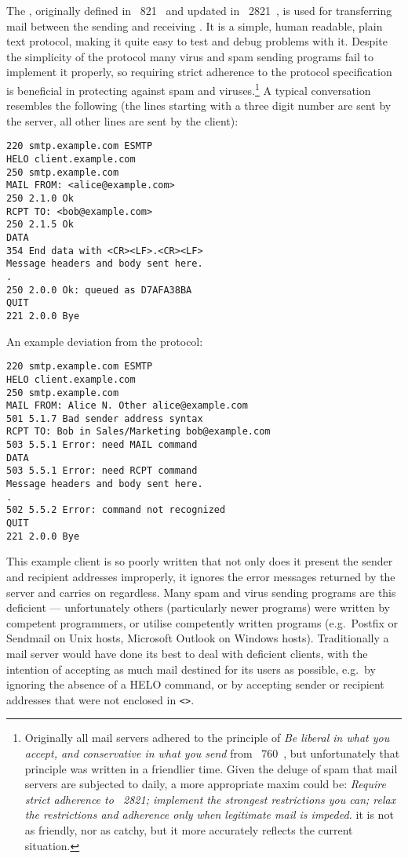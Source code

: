 The \SMTPlong{}, originally defined in \RFC{}~821~\cite{RFC821} and updated
in \RFC{}~2821~\cite{RFC2821}, is used for transferring mail between the
sending and receiving \MTA{}\@.  It is a simple, human readable, plain text
protocol, making it quite easy to test and debug problems with it.  Despite
the simplicity of the protocol many virus and spam sending programs fail
to implement it properly, so requiring strict adherence to the protocol
specification is beneficial in protecting against spam and
viruses.\footnote{\label{footnote:rfc760}Originally all mail servers
adhered to the principle of \textit{Be liberal in what you accept, and
conservative in what you send\/} from \RFC{}~760~\cite{rfc760}, but
unfortunately that principle was written in a friendlier time.  Given the
deluge of spam that mail servers are subjected to daily, a more appropriate
maxim could be: \textit{Require strict adherence to \RFC{}~2821; implement
the strongest restrictions you can; relax the restrictions and adherence
only when legitimate mail is impeded.\/}  it is not as friendly, nor as
catchy, but it more accurately reflects the current situation.} A typical
\SMTP{} conversation resembles the following (the lines starting with a
three digit number are sent by the server, all other lines are sent by the
client):

\begin{verbatim}
220 smtp.example.com ESMTP
HELO client.example.com
250 smtp.example.com
MAIL FROM: <alice@example.com>
250 2.1.0 Ok
RCPT TO: <bob@example.com>
250 2.1.5 Ok
DATA
354 End data with <CR><LF>.<CR><LF>
Message headers and body sent here.
.
250 2.0.0 Ok: queued as D7AFA38BA
QUIT
221 2.0.0 Bye
\end{verbatim}

An example deviation from the protocol:

\begin{verbatim}
220 smtp.example.com ESMTP
HELO client.example.com
250 smtp.example.com
MAIL FROM: Alice N. Other alice@example.com
501 5.1.7 Bad sender address syntax
RCPT TO: Bob in Sales/Marketing bob@example.com
503 5.5.1 Error: need MAIL command
DATA
503 5.5.1 Error: need RCPT command
Message headers and body sent here.
.
502 5.5.2 Error: command not recognized
QUIT
221 2.0.0 Bye
\end{verbatim}

This example client is so poorly written that not only does it present the
sender and recipient addresses improperly, it ignores the error messages
returned by the server and carries on regardless.  Many spam and virus
sending programs are this deficient --- unfortunately others (particularly
newer programs) were written by competent programmers, or utilise
competently written programs (e.g.\ Postfix or Sendmail on Unix hosts,
Microsoft Outlook on Windows hosts).  Traditionally a mail server would
have done its best to deal with deficient clients, with the intention of
accepting as much mail destined for its users as
possible, e.g.\ by ignoring the absence of a HELO
command, or by accepting sender or recipient addresses that were not
enclosed in \texttt{<>}.  

